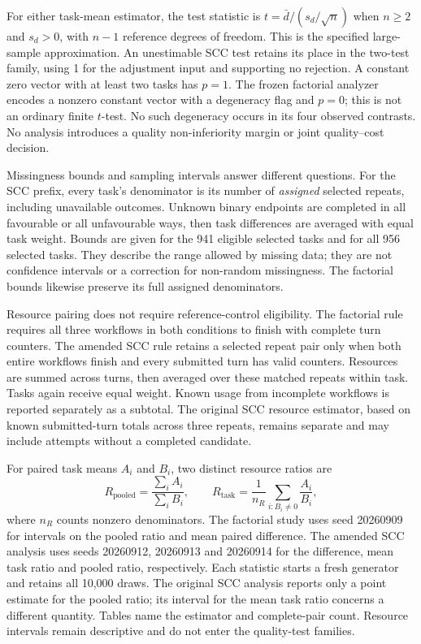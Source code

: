 For either task-mean estimator, the test statistic is $t=\bar d/(s_d/\sqrt n)$ when $n\geq2$ and $s_d>0$, with $n-1$ reference degrees of freedom. This is the specified large-sample approximation. An unestimable SCC test retains its place in the two-test family, using 1 for the adjustment input and supporting no rejection. A constant zero vector with at least two tasks has $p=1$. The frozen factorial analyzer encodes a nonzero constant vector with a degeneracy flag and $p=0$; this is not an ordinary finite $t$-test. No such degeneracy occurs in its four observed contrasts. No analysis introduces a quality non-inferiority margin or joint quality--cost decision.

Missingness bounds and sampling intervals answer different questions. For the SCC prefix, every task's denominator is its number of \emph{assigned} selected repeats, including unavailable outcomes. Unknown binary endpoints are completed in all favourable or all unfavourable ways, then task differences are averaged with equal task weight. Bounds are given for the 941 eligible selected tasks and for all 956 selected tasks. They describe the range allowed by missing data; they are not confidence intervals or a correction for non-random missingness. The factorial bounds likewise preserve its full assigned denominators.

Resource pairing does not require reference-control eligibility. The factorial rule requires all three workflows in both conditions to finish with complete turn counters. The amended SCC rule retains a selected repeat pair only when both entire workflows finish and every submitted turn has valid counters. Resources are summed across turns, then averaged over these matched repeats within task. Tasks again receive equal weight. Known usage from incomplete workflows is reported separately as a subtotal. The original SCC resource estimator, based on known submitted-turn totals across three repeats, remains separate and may include attempts without a completed candidate.

For paired task means $A_i$ and $B_i$, two distinct resource ratios are
\[
R_{\mathrm{pooled}}=\frac{\sum_i A_i}{\sum_i B_i},\qquad
R_{\mathrm{task}}=\frac{1}{n_R}\sum_{i:B_i\ne0}\frac{A_i}{B_i},
\]
where $n_R$ counts nonzero denominators. The factorial study uses seed 20260909 for intervals on the pooled ratio and mean paired difference. The amended SCC analysis uses seeds 20260912, 20260913 and 20260914 for the difference, mean task ratio and pooled ratio, respectively. Each statistic starts a fresh generator and retains all 10,000 draws. The original SCC analysis reports only a point estimate for the pooled ratio; its interval for the mean task ratio concerns a different quantity. Tables name the estimator and complete-pair count. Resource intervals remain descriptive and do not enter the quality-test families.

